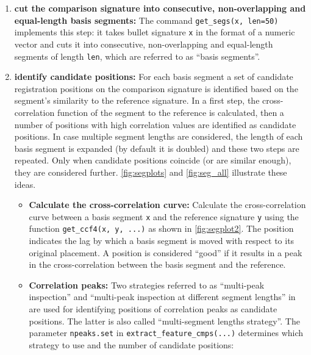 \begin{enumerate}
\def\labelenumi{\arabic{enumi}.}
\item
  \textbf{cut the comparison signature into consecutive, non-overlapping
  and equal-length basis segments:} The command
  \texttt{get\_segs(x,\ len=50)} implements this step: it takes bullet
  signature \texttt{x} in the format of a numeric vector and cuts it
  into consecutive, non-overlapping and equal-length segments of length
  \texttt{len}, which are referred to as ``basis segments''.
\item
  \textbf{identify candidate positions:} For each basis segment a set of
  candidate registration positions on the comparison signature is
  identified based on the segment's similarity to the reference
  signature. In a first step, the cross-correlation function of the
  segment to the reference is calculated, then a number of positions
  with high correlation values are identified as candidate positions. In
  case multiple segment lengths are considered, the length of each basis
  segment is expanded (by default it is doubled) and these two steps are
  repeated. Only when candidate positions coincide (or are similar
  enough), they are considered further. \autoref{fig:segplots} and
  \autoref{fig:seg_all} illustrate these ideas.

  \begin{itemize}
  \item
    \textbf{Calculate the cross-correlation curve:} Calculate the
    cross-correlation curve between a basis segment \texttt{x} and the
    reference signature \texttt{y} using the function
    \texttt{get\_ccf4(x,\ y,\ ...)} as shown in \autoref{fig:segplot2}.
    The position indicates the lag by which a basis segment is moved
    with respect to its original placement. A position is considered
    ``good'' if it results in a peak in the cross-correlation between
    the basis segment and the reference.
  \item
    \textbf{Correlation peaks:} Two strategies referred to as
    ``multi-peak inspection'' and ``multi-peak inspection at different
    segment lengths'' in \citet{cmps} are used for identifying positions
    of correlation peaks as candidate positions. The latter is also
    called ``multi-segment lengths strategy''. The parameter
    \texttt{npeaks.set} in \texttt{extract\_feature\_cmps(...)}
    determines which strategy to use and the number of candidate
    positions:


\end{itemize}
\end{enumerate}

